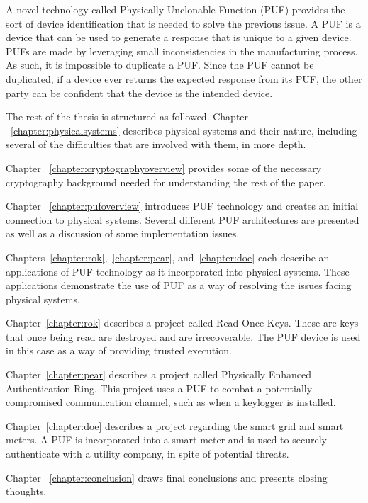 A novel technology called Physically Unclonable Function (PUF) provides the sort of device identification that is needed
to solve the previous issue. A PUF is a device that can be used to generate a response that is unique to a given device.
PUFs are made by leveraging small inconsistencies in the manufacturing process. As such, it is impossible to
duplicate a PUF. Since the PUF cannot be duplicated, if a device ever returns the expected response from its PUF,
the other party can be confident that the device is the intended device.

The rest of the thesis is structured as followed. 
Chapter ~\ref{chapter:physicalsystems} describes physical systems and their nature, including several of the difficulties that are involved with them, in more depth. 

Chapter ~\ref{chapter:cryptographyoverview} provides some of the necessary cryptography background needed for
understanding the rest of the paper.

Chapter ~\ref{chapter:pufoverview} introduces PUF technology and creates an initial connection to physical systems. 
Several different PUF architectures are presented as well as a discussion of some implementation issues.

Chapters~\ref{chapter:rok},~\ref{chapter:pear}, and~\ref{chapter:doe} each describe an applications of PUF 
technology as it incorporated into physical systems. These applications demonstrate the use of PUF as a way of 
resolving the issues facing physical systems. 

Chapter~\ref{chapter:rok} describes a project called Read Once Keys. These are keys that once being read are
destroyed and are irrecoverable. The PUF device is used in this case as a way of providing trusted execution.

Chapter~\ref{chapter:pear} describes a project called Physically Enhanced Authentication Ring. This project uses
a PUF to combat a potentially compromised communication channel, such as when a keylogger is installed.

Chapter~\ref{chapter:doe} describes a project regarding the smart grid and smart meters. A PUF is incorporated
into a smart meter and is used to securely authenticate with a utility company, in spite of potential threats.

Chapter ~\ref{chapter:conclusion} draws final conclusions and presents closing thoughts.
